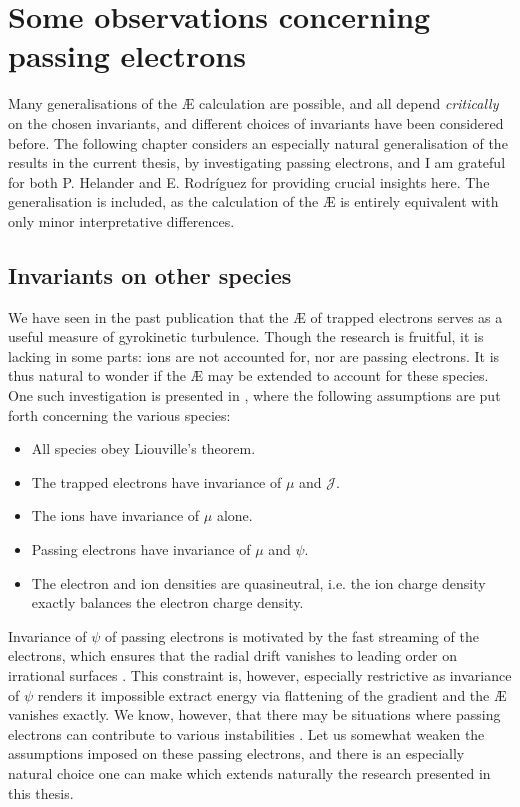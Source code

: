 \chapter{Some observations concerning passing electrons}
\vspace*{3mm}
Many generalisations of the \AE{} calculation are possible, and all depend {\it critically} on the chosen invariants, and different choices of invariants have been considered before. The following chapter considers an especially natural generalisation of the results in the current thesis, by investigating passing electrons, and I am grateful for both P. Helander and E. Rodr\'iguez for providing crucial insights here. The generalisation is included, as the calculation of the \AE{} is entirely equivalent with only minor interpretative differences.

\section{Invariants on other species}
We have seen in the past publication that the \AE{} of trapped electrons serves as a useful measure of gyrokinetic turbulence. Though the research is fruitful, it is lacking in some parts: ions are not accounted for, nor are passing electrons. It is thus natural to wonder if the \AE{} may be extended to account for these species. One such investigation is presented in \citet{helander2020available}, where the following assumptions are put forth concerning the various species:
\begin{itemize}
    \item All species obey Liouville's theorem.
    \item The trapped electrons have invariance of $\mu$ and $\mathcal{J}$.
    \item The ions have invariance of $\mu$ alone.
    \item Passing electrons have invariance of $\mu$ and $\psi$.
    \item The electron and ion densities are quasineutral, i.e. the ion charge density exactly balances the electron charge density.
\end{itemize}
Invariance of $\psi$ of passing electrons is motivated by the fast streaming of the electrons, which ensures that the radial drift vanishes to leading order on irrational surfaces \cite{helander2014theory}. This constraint is, however, especially restrictive as invariance of $\psi$ renders it impossible extract energy via flattening of the gradient and the \AE{} vanishes exactly. We know, however, that there may be situations where passing electrons can contribute to various instabilities \cite{jenko2000electron,landreman2015universal,helander2015universal,hardman2022extended,costello2022universal}. Let us somewhat weaken the assumptions imposed on these passing electrons, and there is an especially natural choice one can make which extends naturally the research presented in this thesis. 

